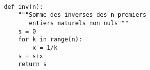 \exer{}
\setcounter{numques}{0}


\begin{lstlisting}

def inv(n):
    """Somme des inverses des n premiers 
       entiers naturels non nuls"""
    s = 0
    for k in range(n):
        x = 1/k
    s = s+x
    return s
\end{lstlisting}

